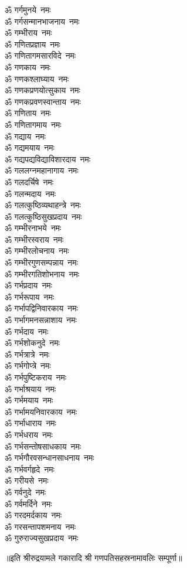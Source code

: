 \begin{multicols}{2}
\begin{flushleft}
ॐ गर्गमुनये~नमः\\
ॐ गर्गसन्मानभाजनाय~नमः\\
ॐ गम्भीराय~नमः\\
ॐ गणितप्रज्ञाय~नमः\\
ॐ गणितागमसारविदे~नमः\\
ॐ गणकाय~नमः\\
ॐ गणकश्लाघ्याय~नमः\hfill{}\\
ॐ गणकप्रणयोत्सुकाय~नमः\\
ॐ गणकप्रवणस्वान्ताय~नमः\\
ॐ गणिताय~नमः\\
ॐ गणितागमाय~नमः\\
ॐ गद्याय~नमः\\
ॐ गद्यमयाय~नमः\\
ॐ गद्यपद्यविद्याविशारदाय~नमः\\
ॐ गललग्नमहानागाय~नमः\\
ॐ गलदर्चिषे~नमः\\
ॐ गलन्मदाय~नमः\hfill{}\\
ॐ गलत्कुष्ठिव्यथाहन्त्रे~नमः\\
ॐ गलत्कुष्ठिसुखप्रदाय~नमः\\
ॐ गम्भीरनाभये~नमः\\
ॐ गम्भीरस्वराय~नमः\\
ॐ गम्भीरलोचनाय~नमः\\
ॐ गम्भीरगुणसम्पन्नाय~नमः\\
ॐ गम्भीरगतिशोभनाय~नमः\\
ॐ गर्भप्रदाय~नमः\\
ॐ गर्भरूपाय~नमः\\
ॐ गर्भापद्विनिवारकाय~नमः\hfill{}\\
ॐ गर्भागमनसन्नाशाय~नमः\\
ॐ गर्भदाय~नमः\\
ॐ गर्भशोकनुदे~नमः\\
ॐ गर्भत्रात्रे~नमः\\
ॐ गर्भगोप्त्रे~नमः\\
ॐ गर्भपुष्टिकराय~नमः\\
ॐ गर्भाश्रयाय~नमः\\
ॐ गर्भमयाय~नमः\\
ॐ गर्भामयनिवारकाय~नमः\\
ॐ गर्भाधाराय~नमः\hfill{}\\
ॐ गर्भधराय~नमः\\
ॐ गर्भसन्तोषसाधकाय~नमः\\
ॐ गर्भगौरवसन्धानसाधनाय~नमः\\
ॐ गर्भवर्गहृदे~नमः\\
ॐ गरीयसे~नमः\\
ॐ गर्वनुदे~नमः\\
ॐ गर्वमर्दिने~नमः\\
ॐ गरदमर्दकाय~नमः\\
ॐ गरसन्तापशमनाय~नमः\\
ॐ गुरुराज्यसुखप्रदाय~नमः\hfill{}\\
\end{flushleft}
\end{multicols}
\centerline{॥इति श्रीरुद्रयामले गकारादि श्री गणपतिसहस्रनामावलिः सम्पूर्णा॥}
